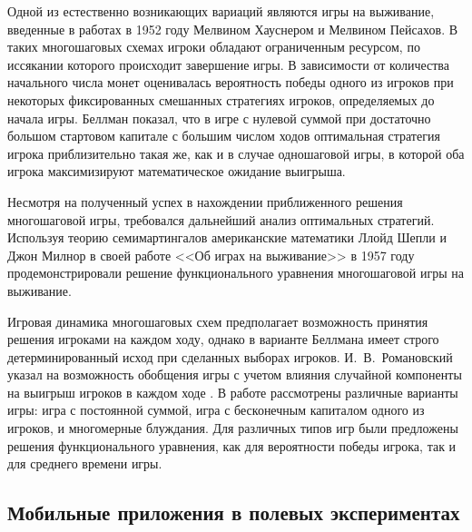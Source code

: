 Одной из естественно возникающих вариаций являются игры на выживание, введенные в работах \cite{hausner_games_1952,peisakoff_more_1952} в 1952 году Мелвином Хауснером и Мелвином Пейсахов. В таких многошаговых схемах игроки обладают ограниченным ресурсом, по иссякании которого происходит завершение игры. В зависимости от количества начального числа монет оценивалась вероятность победы одного из игроков при некоторых фиксированных смешанных стратегиях игроков, определяемых до начала игры. Беллман показал, что в игре с нулевой суммой при достаточно большом стартовом капитале с большим числом ходов оптимальная стратегия игрока приблизительно такая же, как и в случае одношаговой игры, в которой оба игрока максимизируют математическое ожидание выигрыша. 

Несмотря на полученный успех в нахождении приближенного решения многошаговой игры, требовался дальнейший анализ оптимальных стратегий. Используя теорию семимартингалов американские математики Ллойд Шепли и Джон Милнор в своей работе <<Об играх на выживание>> в 1957 году \cite{milnor_games_1956} продемонстрировали решение функционального уравнения многошаговой игры на выживание. 

Игровая динамика многошаговых схем предполагает возможность принятия решения игроками на каждом ходу, однако в варианте Беллмана имеет строго детерминированный исход при сделанных выборах игроков. И.~В.~Романовский указал на возможность обобщения игры с учетом влияния случайной компоненты на выигрыш игроков в каждом ходе \cite{romanovsky_1961}. В работе рассмотрены различные варианты игры: игра с постоянной суммой, игра с бесконечным капиталом одного из игроков, и многомерные блуждания. Для различных типов игр были предложены решения функционального уравнения, как для вероятности победы игрока, так и для среднего времени игры.

\subsection{Мобильные приложения в полевых экспериментах}\label{subsec:ch1/sec3/sub3}

